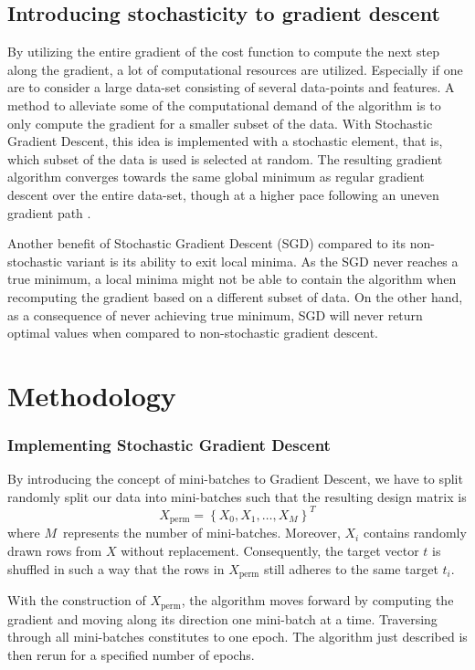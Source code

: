 \documentclass[11pt, a4paper]{article}
\begin{document}
\subsection*{Introducing stochasticity to gradient descent}
By utilizing the entire gradient of the cost function to compute the next step along the gradient, a lot of computational resources are utilized. Especially if one are to consider a large data-set consisting of several data-points and features. A method to alleviate some of the computational demand of the algorithm is to only compute the gradient for a smaller subset of the data. With Stochastic Gradient Descent, this idea is implemented with a stochastic element, that is, which subset of the data is used is selected at random. The resulting gradient algorithm converges towards the same global minimum as regular gradient descent over the entire data-set, though at a higher pace following an uneven gradient path \cite{Geron2019}.

Another benefit of Stochastic Gradient Descent (SGD) compared to its non-stochastic variant is its ability to exit local minima. As the SGD never reaches a true minimum, a local minima might not be able to contain the algorithm when recomputing the gradient based on a different subset of data. On the other hand, as a consequence of never achieving true minimum, SGD will never return optimal values when compared to non-stochastic gradient descent. 

\section*{Methodology}
\subsubsection*{Implementing Stochastic Gradient Descent}
By introducing the concept of mini-batches to Gradient Descent, we have to split randomly split our data into mini-batches such that the resulting design matrix is 
$$
X_{\text{perm}} = \left\{X_0, X_1, \ldots, X_M\right\}^T
$$
where $M$ represents the number of mini-batches. Moreover, $X_i$ contains randomly drawn rows from $X$ without replacement. Consequently, the target vector $t$ is shuffled in such a way that the rows in $X_{\text{perm}}$ still adheres to the same target $t_i$.

With the construction of $X_\text{perm}$, the algorithm moves forward by computing the gradient and moving along its direction one mini-batch at a time. Traversing through all mini-batches constitutes to one epoch. The algorithm just described is then rerun for a specified number of epochs.
\end{document}
